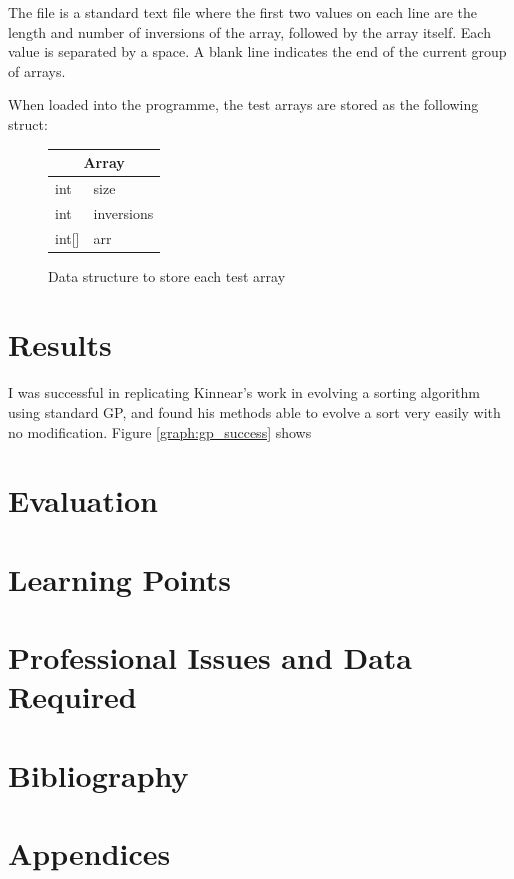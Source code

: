 \documentclass{article}
\begin{document}
        The file is a standard text file where the first two values on each line are the length and number of inversions of the array, followed by the array itself. Each value is separated by a space. A blank line indicates the end of the current group of arrays.
        
        When loaded into the programme, the test arrays are stored as the following struct:
        
        \begin{figure}[h]
            \centering
            \begin{tabular}{|l l|}
                \hline
                \multicolumn{2}{|c|}{Array}\\
                \hline
                int & size \\
                int & inversions\\
                int[] & arr\\
                \hline
            \end{tabular}
            \caption{Data structure to store each test array}
            
            \label{struct:array}
        \end{figure}

    \section{Results}

        I was successful in replicating Kinnear's work in evolving a sorting algorithm using standard GP, and found his methods able to evolve a sort very easily with no modification. Figure \ref{graph:gp_success} shows 
    \section{Evaluation}

    \section{Learning Points}

    \section{Professional Issues and Data Required}

    \section{Bibliography}

    
    

    \section{Appendices}
\end{document}
